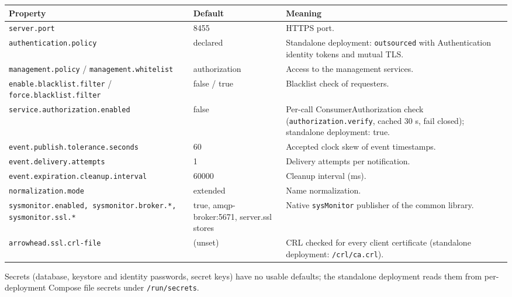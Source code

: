 \documentclass[a4paper]{arrowhead}
\begin{document}
\noindent\begin{longtable}{| p{5.4cm} | p{3.4cm} | p{6.4cm} |} \hline
\rowcolor{gray!33} Property & Default & Meaning \\ \hline \endhead
\texttt{server.\allowbreak{}port} & 8455 & HTTPS port. \\ \hline
\texttt{authentication.\allowbreak{}policy} & declared & Standalone deployment: \texttt{outsourced} with Authentication identity tokens and mutual TLS. \\ \hline
\texttt{management.\allowbreak{}policy} / \texttt{management.\allowbreak{}whitelist} & authorization & Access to the management services. \\ \hline
\texttt{enable.\allowbreak{}blacklist.\allowbreak{}filter} / \texttt{force.\allowbreak{}blacklist.\allowbreak{}filter} & false / true & Blacklist check of requesters. \\ \hline
\texttt{service.\allowbreak{}authorization.\allowbreak{}enabled} & false & Per-call Consumer\allowbreak{}Authorization check (\texttt{authorization.\allowbreak{}verify}, cached 30 s, fail closed); standalone deployment: true. \\ \hline
\texttt{event.\allowbreak{}publish.\allowbreak{}tolerance.\allowbreak{}seconds} & 60 & Accepted clock skew of event timestamps. \\ \hline
\texttt{event.\allowbreak{}delivery.\allowbreak{}attempts} & 1 & Delivery attempts per notification. \\ \hline
\texttt{event.\allowbreak{}expiration.\allowbreak{}cleanup.\allowbreak{}interval} & 60000 & Cleanup interval (ms). \\ \hline
\texttt{normalization.\allowbreak{}mode} & extended & Name normalization. \\ \hline
\texttt{sysmonitor.\allowbreak{}enabled,\allowbreak{} sysmonitor.\allowbreak{}broker.\allowbreak{}*,\allowbreak{} sysmonitor.\allowbreak{}ssl.\allowbreak{}*} & true, amqp-broker:5671, server.ssl stores & Native \texttt{sysMonitor} publisher of the common library. \\ \hline
\texttt{arrowhead.\allowbreak{}ssl.\allowbreak{}crl-\allowbreak{}file} & (unset) & CRL checked for every client certificate (standalone deployment: \texttt{/\allowbreak{}crl/\allowbreak{}ca.\allowbreak{}crl}). \\ \hline
\end{longtable}

Secrets (database, keystore and identity passwords, secret keys) have no usable defaults; the standalone deployment reads them from per-deployment Compose file secrets under \texttt{/\allowbreak{}run/\allowbreak{}secrets}.
\end{document}
